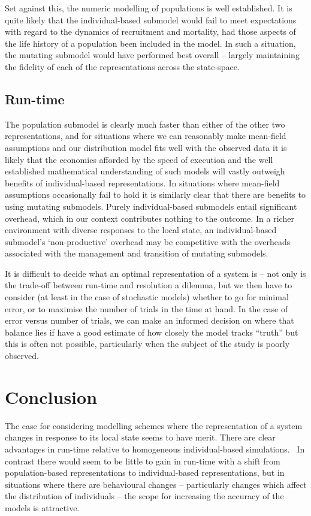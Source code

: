 \documentclass{article}
\begin{document}
Set against this, the numeric modelling of populations is well established. It
is quite likely that the individual-based submodel would fail to meet
expectations with regard to the dynamics of recruitment and mortality, had
those aspects of the life history of a population been included in the model.
In such a situation, the mutating submodel would have performed best overall
-- largely maintaining the fidelity of each of the representations across the
state-space.



\subsection{Run-time}

The population submodel is clearly much faster than either of the other two
representations, and for situations where we can reasonably make mean-field
assumptions and our distribution model fits well with the observed data it is
likely that the economies afforded by the speed of execution and the well
established mathematical understanding of such models will vastly outweigh
benefits of individual-based representations. In situations where mean-field
assumptions occasionally fail to hold it is similarly clear that there are
benefits to using mutating submodels. Purely individual-based submodels entail
significant overhead, which in our context contributes nothing to the outcome.
In a richer environment with diverse responses to the local state, an
individual-based submodel's `non-productive' overhead may be competitive with
the overheads associated with the management and transition of mutating
submodels.

It is difficult to decide what an optimal representation of a system is --
not only is the trade-off between run-time and resolution a dilemma, but we
then have to consider (at least in the case of stochastic models) whether to
go for minimal error, or to maximise the number of trials in the time at hand.
In the case of error versus number of trials, we can make an informed decision
on where that balance lies if have a good estimate of how closely the model
tracks ``truth'' but this is often not possible, particularly when the subject
of the study is poorly observed.

\section{Conclusion}

The case for considering modelling schemes where the representation of a
system changes in response to its local state seems to have merit. There are
clear advantages in run-time relative to homogeneous individual-based
simulations. \ In contrast there would seem to be little to gain in run-time
with a shift from population-based representations to individual-based
representations, but in situations where there are behavioural changes --
particularly changes which affect the distribution of individuals -- the scope
for increasing the accuracy of the models is attractive.
\end{document}
